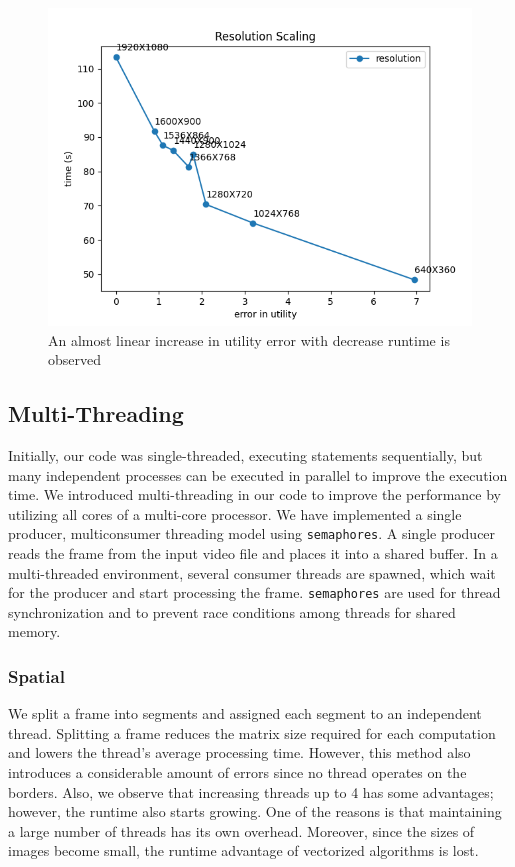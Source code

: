 \documentclass[conference]{IEEEtran}
\begin{document}
\begin{figure}[htbp]
\centerline{\includegraphics[scale=0.55]{plots/plot_resolution.png}}
\caption{An almost linear increase in utility error with decrease runtime is observed}
\label{res_evt} 
\end{figure}
    

\subsection{Multi-Threading}
Initially, our code was single-threaded, executing statements sequentially, but many independent processes can be executed in parallel to improve the execution time.
We introduced multi-threading in our code to improve the performance by utilizing all cores of a multi-core processor. We have implemented a single producer, multiconsumer threading model using \verb|semaphores|.
A single producer reads the frame from the input video file and places it into a shared buffer. In a multi-threaded environment, several consumer threads are spawned, which wait for the
producer and start processing the frame. \verb|semaphores| are used for thread synchronization and to prevent race conditions among threads for shared memory.

\subsubsection{Spatial} 
We split a frame into segments and assigned each segment to an independent thread. Splitting a frame reduces the matrix size required for each computation and lowers the
thread's average processing time. However, this method also introduces a considerable amount of errors since no thread operates on the borders.
Also, we observe that increasing threads up to 4 has some advantages; however, the runtime also starts growing. One of the reasons is that maintaining a large number of threads
has its own overhead. Moreover, since the sizes of images become small, the runtime advantage of vectorized algorithms is lost.
\end{document}
